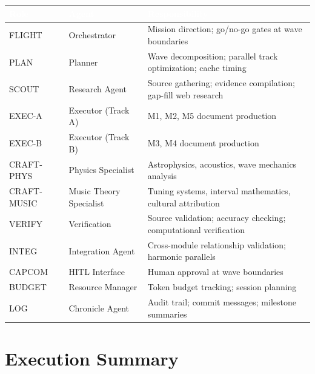 \documentclass[11pt,letterpaper]{article}
\newcommand{\tableheader}[1]{\textbf{\sffamily\textcolor{white}{#1}}}
\begin{document}
\begin{center}
\begin{tabularx}{\textwidth}{C{2cm}L{2.5cm}X}
\toprule
{}
\tableheader{Role} & \tableheader{Agent} & \tableheader{Responsibility} \\
\midrule
FLIGHT & Orchestrator & Mission direction; go/no-go gates at wave boundaries \\
PLAN & Planner & Wave decomposition; parallel track optimization; cache timing \\
SCOUT & Research Agent & Source gathering; evidence compilation; gap-fill web research \\
EXEC-A & Executor (Track A) & M1, M2, M5 document production \\
EXEC-B & Executor (Track B) & M3, M4 document production \\
CRAFT-PHYS & Physics Specialist & Astrophysics, acoustics, wave mechanics analysis \\
CRAFT-MUSIC & Music Theory Specialist & Tuning systems, interval mathematics, cultural attribution \\
VERIFY & Verification & Source validation; accuracy checking; computational verification \\
INTEG & Integration Agent & Cross-module relationship validation; harmonic parallels \\
CAPCOM & HITL Interface & Human approval at wave boundaries \\
BUDGET & Resource Manager & Token budget tracking; session planning \\
LOG & Chronicle Agent & Audit trail; commit messages; milestone summaries \\
\bottomrule
\end{tabularx}
\end{center}

\section{Execution Summary}
\end{document}
